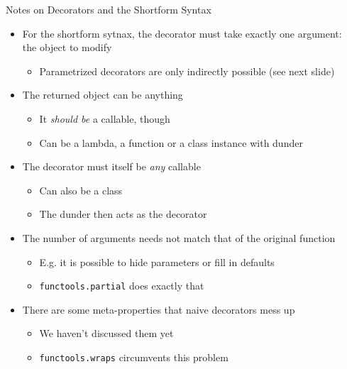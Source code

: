 \begin{frame}[fragile]{Notes on Decorators and the Shortform Syntax}
%
\begin{itemize}
\item For the shortform sytnax, the decorator must take exactly one argument:\\
	the object to modify
	\begin{itemize}
	\item Parametrized decorators are only indirectly possible (see next slide)
	\end{itemize}
\item The returned object can be anything
	\begin{itemize}
	\item It \emph{should be} a callable, though
	\item Can be a lambda, a function or a class instance with dunder 
	\end{itemize}
\item The decorator must itself be \emph{any} callable
	\begin{itemize}
	\item Can also be a class
	\item The dunder  then acts as the decorator
	\end{itemize}
\item The number of arguments needs not match that of the original function
	\begin{itemize}
	\item E.\;g. it is possible to hide parameters or fill in defaults
	\item \texttt{functools.partial} does exactly that
	\end{itemize}
\item There are some meta-properties that naive decorators mess up
	\begin{itemize}
	\item We haven't discussed them yet
	\item \texttt{functools.wraps} circumvents this problem
	\end{itemize}
\end{itemize}
%
\end{frame}


